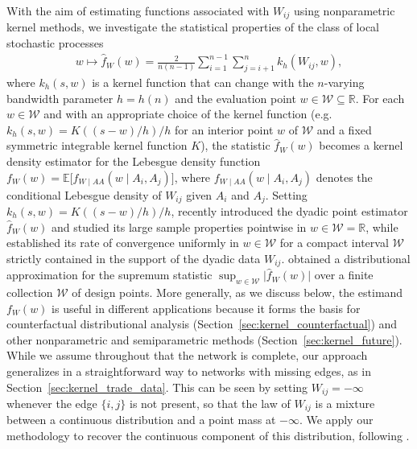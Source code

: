 \documentclass[11pt,lof]{puthesis}
\newcommand{\R}{\ensuremath{\mathbb{R}}}
\newcommand{\E}{\ensuremath{\mathbb{E}}}
\newcommand{\cW}{\ensuremath{\mathcal{W}}}
\theoremstyle{break}
\theoremstyle{proof}
\begin{document}
With the aim of estimating functions associated with $W_{i j}$
using nonparametric kernel methods, we investigate the statistical
properties of the class of local stochastic processes
%
\begin{align}\label{eq:kernel_estimator}
  w \mapsto \hat{f}_W(w)
  = \frac{2}{n(n-1)} \sum_{i=1}^{n-1} \sum_{j=i+1}^n k_h(W_{i j},w),
\end{align}
%
where $k_h(s,w)$ is a kernel function that can change with the $n$-varying
bandwidth parameter $h=h(n)$ and the evaluation point $w \in \cW\subseteq \R$.
For each $w\in\cW$ and with an appropriate choice of the kernel function
(e.g.\ $k_h(s,w)=K((s-w)/h)/h$ for an interior point $w$ of $\cW$ and a
fixed symmetric integrable kernel function $K$), the statistic $\hat{f}_W(w)$
becomes a kernel density estimator for the Lebesgue density function
$f_W(w) = \E\big[f_{W \mid AA}(w \mid A_i,A_j)\big]$, where
$f_{W \mid AA}(w \mid A_i,A_j)$ denotes the conditional Lebesgue density of
$W_{i j}$ given $A_i$ and $A_j$. Setting $k_h(s,w)=K((s-w)/h)/h$,
\citet{graham2024kernel} recently introduced the dyadic point estimator
$\hat{f}_W(w)$ and studied its large sample properties pointwise in
$w\in\cW=\mathbb{R}$, while \citet{chiang2020empirical} established its rate of
convergence uniformly in $w\in\cW$ for a compact interval $\cW$ strictly
contained in the support of the dyadic data $W_{i j}$.
\citet{chiang2022inference} obtained a distributional approximation for the
supremum statistic $\sup_{w\in\cW}\big|\hat{f}_W(w)\big|$ over a finite
collection $\cW$ of design points. More generally, as we discuss below, the
estimand $f_W(w)$ is useful in different applications because it forms the
basis for counterfactual distributional analysis
(Section~\ref{sec:kernel_counterfactual}) and other nonparametric and
semiparametric
methods (Section~\ref{sec:kernel_future}). While we assume throughout
that the network is complete, our approach generalizes in a straightforward way
to networks with missing edges, as in Section~\ref{sec:kernel_trade_data}.
This can be
seen by setting $W_{i j} = -\infty$ whenever the edge $\{i, j\}$ is not
present, so that the law of $W_{i j}$ is a mixture between a continuous
distribution and a point mass at $-\infty$. We apply our methodology to
recover the continuous component of this distribution, following
\citet{chiang2022inference}.
\end{document}
